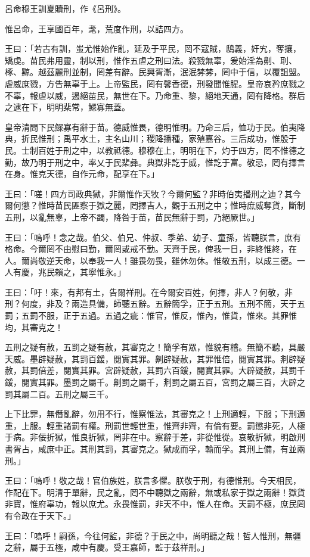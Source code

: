 
\begin{pinyinscope}
呂命穆王訓夏贖刑，作《呂刑》。

惟呂命，王享國百年，耄，荒度作刑，以詰四方。

王曰：「若古有訓，蚩尤惟始作亂，延及于平民，罔不寇賊，鴟義，奸宄，奪攘，矯虔。苗民弗用靈，制以刑，惟作五虐之刑曰法。殺戮無辜，爰始淫為劓、刵、椓、黥。越茲麗刑並制，罔差有辭。民興胥漸，泯泯棼棼，罔中于信，以覆詛盟。虐威庶戮，方告無辜于上。上帝監民，罔有馨香德，刑發聞惟腥。皇帝哀矜庶戮之不辜，報虐以威，遏絕苗民，無世在下。乃命重、黎，絕地天通，罔有降格。群后之逮在下，明明棐常，鰥寡無蓋。

皇帝清問下民鰥寡有辭于苗。德威惟畏，德明惟明。乃命三后，恤功于民。伯夷降典，折民惟刑；禹平水土，主名山川；稷降播種，家殖嘉谷。三后成功，惟殷于民。士制百姓于刑之中，以教祗德。穆穆在上，明明在下，灼于四方，罔不惟德之勤，故乃明于刑之中，率乂于民棐彝。典獄非訖于威，惟訖于富。敬忌，罔有擇言在身。惟克天德，自作元命，配享在下。」

王曰：「嗟！四方司政典獄，非爾惟作天牧？今爾何監？非時伯夷播刑之迪？其今爾何懲？惟時苗民匪察于獄之麗，罔擇吉人，觀于五刑之中；惟時庶威奪貨，斷制五刑，以亂無辜，上帝不蠲，降咎于苗，苗民無辭于罰，乃絕厥世。」

王曰：「嗚呼！念之哉。伯父、伯兄、仲叔、季弟、幼子、童孫，皆聽朕言，庶有格命。今爾罔不由慰曰勤，爾罔或戒不勤。天齊于民，俾我一日，非終惟終，在人。爾尚敬逆天命，以奉我一人！雖畏勿畏，雖休勿休。惟敬五刑，以成三德。一人有慶，兆民賴之，其寧惟永。」

王曰：「吁！來，有邦有土，告爾祥刑。在今爾安百姓，何擇，非人？何敬，非刑？何度，非及？兩造具備，師聽五辭。五辭簡孚，正于五刑。五刑不簡，天于五罰；五罰不服，正于五過。五過之疵：惟官，惟反，惟內，惟貨，惟來。其罪惟均，其審克之！

五刑之疑有赦，五罰之疑有赦，其審克之！簡孚有眾，惟貌有稽。無簡不聽，具嚴天威。墨辟疑赦，其罰百鍰，閱實其罪。劓辟疑赦，其罪惟倍，閱實其罪。剕辟疑赦，其罰倍差，閱實其罪。宮辟疑赦，其罰六百鍰，閱實其罪。大辟疑赦，其罰千鍰，閱實其罪。墨罰之屬千。劓罰之屬千，剕罰之屬五百，宮罰之屬三百，大辟之罰其屬二百。五刑之屬三千。

上下比罪，無僭亂辭，勿用不行，惟察惟法，其審克之！上刑適輕，下服；下刑適重，上服。輕重諸罰有權。刑罰世輕世重，惟齊非齊，有倫有要。罰懲非死，人極于病。非佞折獄，惟良折獄，罔非在中。察辭于差，非從惟從。哀敬折獄，明啟刑書胥占，咸庶中正。其刑其罰，其審克之。獄成而孚，輸而孚。其刑上備，有並兩刑。」

王曰：「嗚呼！敬之哉！官伯族姓，朕言多懼。朕敬于刑，有德惟刑。今天相民，作配在下。明清于單辭，民之亂，罔不中聽獄之兩辭，無或私家于獄之兩辭！獄貨非寶，惟府辜功，報以庶尤。永畏惟罰，非天不中，惟人在命。天罰不極，庶民罔有令政在于天下。」

王曰：「嗚呼！嗣孫，今往何監，非德？于民之中，尚明聽之哉！哲人惟刑，無疆之辭，屬于五極，咸中有慶。受王嘉師，監于茲祥刑。」


\end{pinyinscope}